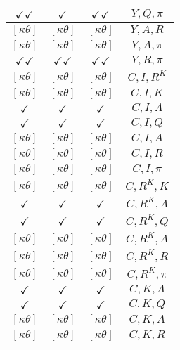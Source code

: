 \documentclass[a4paper,10pt]{article}
\begin{document}
\begin{longtable}{|c|c|c|c|}
\hline
$\checkmark\checkmark$ & $\checkmark$ & $\checkmark\checkmark$ & ${Y},{Q},{\pi}$ \\
\hline
$[\kappa \theta ]$ & $[\kappa \theta ]$ & $[\kappa \theta ]$ & ${Y},{A},{R}$ \\
\hline
$[\kappa \theta ]$ & $[\kappa \theta ]$ & $[\kappa \theta ]$ & ${Y},{A},{\pi}$ \\
\hline
$\checkmark\checkmark$ & $\checkmark\checkmark$ & $\checkmark\checkmark$ & ${Y},{R},{\pi}$ \\
\hline
$[\kappa \theta ]$ & $[\kappa \theta ]$ & $[\kappa \theta ]$ & ${C},{I},{R^{K}}$ \\
\hline
$[\kappa \theta ]$ & $[\kappa \theta ]$ & $[\kappa \theta ]$ & ${C},{I},{K}$ \\
\hline
$\checkmark$ & $\checkmark$ & $\checkmark$ & ${C},{I},{\Lambda}$ \\
\hline
$\checkmark$ & $\checkmark$ & $\checkmark$ & ${C},{I},{Q}$ \\
\hline
$[\kappa \theta ]$ & $[\kappa \theta ]$ & $[\kappa \theta ]$ & ${C},{I},{A}$ \\
\hline
$[\kappa \theta ]$ & $[\kappa \theta ]$ & $[\kappa \theta ]$ & ${C},{I},{R}$ \\
\hline
$[\kappa \theta ]$ & $[\kappa \theta ]$ & $[\kappa \theta ]$ & ${C},{I},{\pi}$ \\
\hline
$[\kappa \theta ]$ & $[\kappa \theta ]$ & $[\kappa \theta ]$ & ${C},{R^{K}},{K}$ \\
\hline
$\checkmark$ & $\checkmark$ & $\checkmark$ & ${C},{R^{K}},{\Lambda}$ \\
\hline
$\checkmark$ & $\checkmark$ & $\checkmark$ & ${C},{R^{K}},{Q}$ \\
\hline
$[\kappa \theta ]$ & $[\kappa \theta ]$ & $[\kappa \theta ]$ & ${C},{R^{K}},{A}$ \\
\hline
$[\kappa \theta ]$ & $[\kappa \theta ]$ & $[\kappa \theta ]$ & ${C},{R^{K}},{R}$ \\
\hline
$[\kappa \theta ]$ & $[\kappa \theta ]$ & $[\kappa \theta ]$ & ${C},{R^{K}},{\pi}$ \\
\hline
$\checkmark$ & $\checkmark$ & $\checkmark$ & ${C},{K},{\Lambda}$ \\
\hline
$\checkmark$ & $\checkmark$ & $\checkmark$ & ${C},{K},{Q}$ \\
\hline
$[\kappa \theta ]$ & $[\kappa \theta ]$ & $[\kappa \theta ]$ & ${C},{K},{A}$ \\
\hline
$[\kappa \theta ]$ & $[\kappa \theta ]$ & $[\kappa \theta ]$ & ${C},{K},{R}$ \\

\end{longtable}
\end{document}
